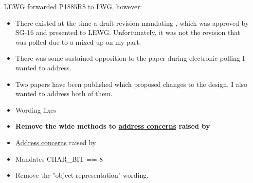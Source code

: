 \documentclass{wg21}
\begin{document}
LEWG forwarded P1885R8 to LWG, however:
\begin{itemize}
    \item There existed at the time a draft revision mandating , which was approved by SG-16 and presented to LEWG. Unfortunately, it was not the revision that was polled due to a mixed up on my part.
    \item There was some sustained opposition to the paper during electronic polling I wanted to address.
    \item Two papers have been published which proposed changes to the design. I also wanted to address both of them.
\end{itemize}


\begin{itemize}
    \item Wording fixes
    \item \textbf{Remove the wide methods to \hyperref[P2491-concerns]{address concerns} raised by }
    \item \hyperref[P2498-concerns]{Address concerns} raised by 

    \item Mandates CHAR_BIT == 8
    \item Remove the "object representation" wording.
\end{itemize}
\end{document}
